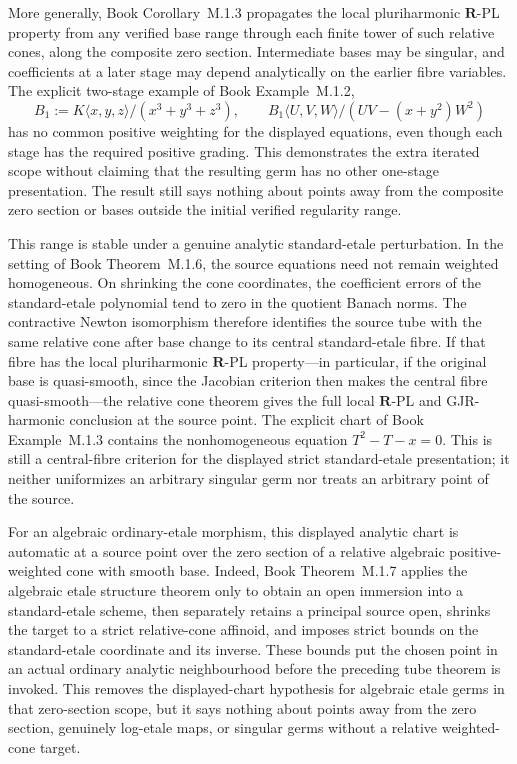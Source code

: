 \documentclass[11pt,a4paper]{article}
\theoremstyle{definition}
\theoremstyle{remark}
\begin{document}
More generally,
Book Corollary~M.1.3 propagates the local
pluriharmonic \(\mathbf R\)-PL property from any verified base range through
each finite tower of such relative cones, along the composite zero section.
Intermediate bases may be singular, and coefficients at a later stage may
depend analytically on the earlier fibre variables.  The explicit two-stage
example of Book Example~M.1.2,
\[
 B_1:=K\langle x,y,z\rangle/(x^3+y^3+z^3),\qquad
 B_1\langle U,V,W\rangle/(UV-(x+y^2)W^2)
\]
has no common positive weighting for the displayed equations, even though
each stage has the required positive grading.  This demonstrates the extra
iterated scope without claiming that the resulting germ has no other
one-stage presentation.  The result still says nothing about points away
from the composite zero section or bases outside the initial verified
regularity range.

This range is stable under a genuine analytic standard-etale perturbation.
In the setting of
Book Theorem~M.1.6, the source equations
need not remain weighted homogeneous.  On shrinking the cone coordinates,
the coefficient errors of the standard-etale polynomial tend to zero in
the quotient Banach norms.  The contractive Newton isomorphism therefore
identifies the source tube with the same relative cone after base change to
its central standard-etale fibre.  If that fibre has the local
pluriharmonic \(\mathbf R\)-PL property---in particular, if the original
base is quasi-smooth, since the Jacobian criterion then makes the central
fibre quasi-smooth---the relative cone theorem gives the full local
\(\mathbf R\)-PL and GJR-harmonic conclusion at the source point.  The
explicit chart of
Book Example~M.1.3 contains the
nonhomogeneous equation \(T^2-T-x=0\).  This is still a central-fibre
criterion for the displayed strict standard-etale presentation; it neither
uniformizes an arbitrary singular germ nor treats an arbitrary point of the
source.

For an algebraic ordinary-etale morphism, this displayed analytic chart is
automatic at a source point over the zero section of a relative algebraic
positive-weighted cone with smooth base.  Indeed,
Book Theorem~M.1.7 applies the
algebraic etale structure theorem only to obtain an open immersion into a
standard-etale scheme, then separately retains a principal source open,
shrinks the target to a strict relative-cone affinoid, and imposes strict
bounds on the standard-etale coordinate and its inverse.  These bounds put
the chosen point in an actual ordinary analytic neighbourhood before the
preceding tube theorem is invoked.  This removes the displayed-chart
hypothesis for algebraic etale germs in that zero-section scope, but it says
nothing about points away from the zero section, genuinely log-etale maps,
or singular germs without a relative weighted-cone target.
\end{document}
